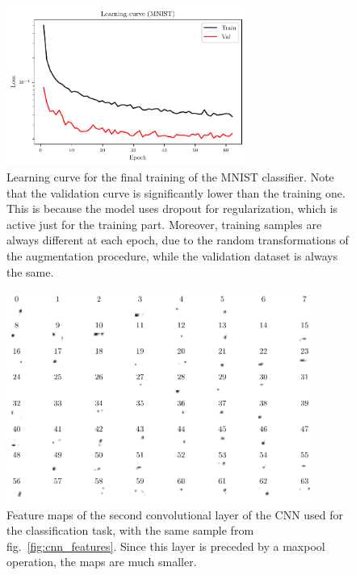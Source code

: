 \documentclass[11pt,a4paper]{scrartcl}
\begin{document}
\begin{figure}[htp]
    \centering
    \includegraphics[width=0.7\textwidth]{../02_Classification/Plots/learning_curves_cnn}
    \caption{Learning curve for the final training of the MNIST classifier. Note that the validation curve is significantly lower than the training one. This is because the model uses dropout for regularization, which is active just for the training part. Moreover, training samples are always different at each epoch, due to the random transformations of the augmentation procedure, while the validation dataset is always the same. \label{fig:learning_curve_cnn}}
\end{figure}


\begin{figure}[htp]
    \centering
    \includegraphics[width=0.9\textwidth]{../02_Classification/Plots/feature_maps_cnn_conv2}
    \caption{Feature maps of the second convolutional layer of the CNN used for the classification task, with the same sample from fig.~\ref{fig:cnn_features}. Since this layer is preceded by a maxpool operation, the maps are much smaller. \label{fig:cnn_features2}}
\end{figure}
\end{document}
